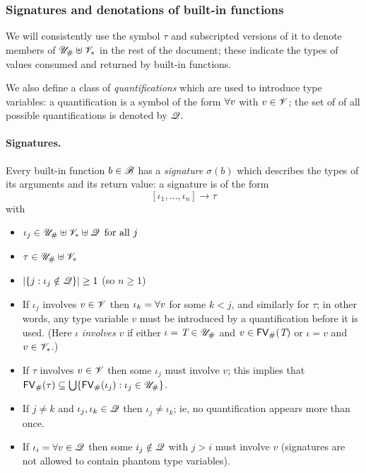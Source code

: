 \subsubsection{Signatures and denotations of built-in functions}
\label{sec:signatures}
We will consistently use the symbol $\tau$ and subscripted versions of it to
denote members of ${\mathscr{U}_{\#}} \uplus \mathscr{V}_*$ in the rest of the document; these indicate the
types of values consumed and returned by built-in functions.%

\medskip
\noindent We also define a class of \textit{quantifications} which are used to
introduce type variables: a quantification is a symbol of the form
$\mathbf{\forall}v$ with $v \in \mathscr{V}$; the set of of all possible quantifications is
denoted by $\mathscr{Q}$.%
%

\medskip
\paragraph{Signatures.}
Every built-in function $b \in \mathscr{B}$ has a \textit{signature} $\sigma(b)$ which describes
the types of its arguments and its return value: a signature is of the form
$$[\iota_1, \ldots, \iota_n] \rightarrow \tau$$ with
\begin{itemize}
  \item $\iota_j \in {\mathscr{U}_{\#}} \uplus \mathscr{V}_* \uplus \mathscr{Q} \enspace\text{for all $j$}$
  \item $\tau \in {\mathscr{U}_{\#}} \uplus \mathscr{V}_*$
  \item $\lvert\{j : \iota_j \notin \mathscr{Q}\}\rvert \geq 1$ (so $n \geq 1$)
  \item If $\iota_j$ involves $v \in \mathscr{V}$ then $\iota_k = \mathbf{\forall}v$ for
    some $k < j$, and similarly for $\tau$; in other words, any type variable
    $v$ must be introduced by a quantification before it is used. (Here $\iota$
    \textit{involves} $v$ if either $\iota = \textit{T} \in {\mathscr{U}_{\#}}$ and $v \in \mathsf{FV}_{\#}(\textit{T})$
    or $\iota = v$ and $v \in \mathscr{V}_*$.)
  \item If $\tau$ involves $v \in \mathscr{V}$ then some $\iota_j$ must involve $v$; this
    implies that $\mathsf{FV}_{\#}(\tau) \subseteq \bigcup \{\mathsf{FV}_{\#}(\iota_j): \iota_j \in {\mathscr{U}_{\#}}\}$.
  \item If $j \neq k$ and $\iota_j, \iota_k \in \mathscr{Q}$ then $\iota_j \neq
    \iota_k$; ie, no quantification appears more than once.
  \item If $\iota_i = \forall v \in \mathscr{Q}$ then some $i_j \notin \mathscr{Q}$ with $j
    > i$ must involve $v$ (signatures are not allowed to contain phantom type variables).
\end{itemize}%
%

